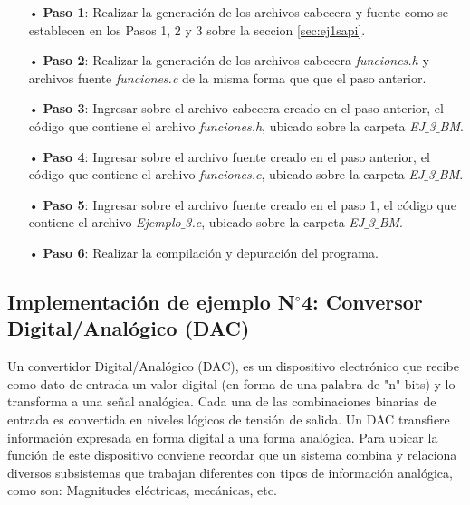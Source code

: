 \documentclass[12pt,letterpaper]{article}
\begin{document}
\begin{enumerate}
\item[•]\textbf{Paso 1}: Realizar la generación de los archivos cabecera y fuente como se establecen en los Pasos 1, 2 y 3 sobre la seccion \ref{sec:ej1sapi}.

\item[•]\textbf{Paso 2}: Realizar la generación de los archivos cabecera \textit{funciones.h} y archivos fuente \textit{funciones.c} de la misma forma que que el paso anterior.

\item[•]\textbf{Paso 3}: Ingresar sobre el archivo cabecera creado en el paso anterior, el código que contiene el archivo \textit{funciones.h}, ubicado sobre la carpeta \textit{EJ$\_$3$\_$BM}.

\item[•]\textbf{Paso 4}: Ingresar sobre el archivo fuente creado en el paso anterior, el código que contiene el archivo \textit{funciones.c}, ubicado sobre la carpeta \textit{EJ$\_$3$\_$BM}.

\item[•]\textbf{Paso 5}: Ingresar sobre el archivo fuente creado en el paso 1, el código que contiene el archivo \textit{Ejemplo$\_$3.c}, ubicado sobre la carpeta \textit{EJ$\_$3$\_$BM}.

\item[•]\textbf{Paso 6}: Realizar la compilación y depuración del programa.
\end{enumerate}

\subsection{Implementación de ejemplo N$^{\circ}$4: Conversor Digital/Analógico (DAC)}\label{sec:ej4sapi}

Un convertidor Digital/Analógico (DAC), es un dispositivo electrónico que recibe como dato de entrada un valor digital (en forma de una palabra de "n" bits) y lo transforma a una señal analógica. Cada una de las combinaciones binarias de entrada es convertida en niveles lógicos de tensión de salida. Un DAC transfiere información expresada en forma digital a una forma analógica. Para ubicar la función de este dispositivo conviene recordar que un sistema combina y relaciona diversos subsistemas que trabajan diferentes con tipos de información analógica, como son: Magnitudes eléctricas, mecánicas, etc.
 \\
 
\end{document}
